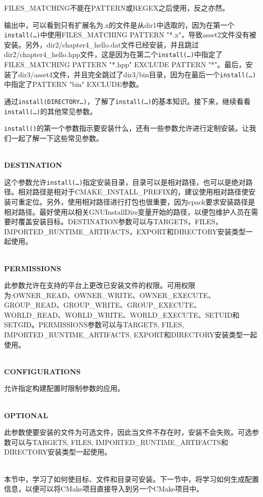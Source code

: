 \begin{tcolorbox}[colback=webgreen!5!white,colframe=webgreen!75!black,title=Note]
FILES\_MATCHING不能在PATTERN或REGEX之后使用，反之亦然。
\end{tcolorbox}

输出中，可以看到只有扩展名为.x的文件是从dir1中选取的，因为在第一个\texttt{install(…)}中使用FILES\_MATCHING PATTERN "*.x"，导致asset2文件没有被安装。另外，dir2/chapter4\_hello.dat文件已经安装，并且跳过dir2/chapter4\_hello.hpp文件，这是因为在第二个\texttt{install(…)}中指定了FILES\_MATCHING PATTERN "*.hpp" EXCLUDE PATTERN "*"。最后，安装了dir3/asset4文件，并且完全跳过了dir3/bin目录，因为在最后一个\texttt{install(…)}中指定了PATTERN "bin" EXCLUDE参数。

通过\texttt{install(DIRECTORY…)}，了解了\texttt{install(…)}的基本知识。接下来，继续看看\texttt{install(…)}的其他常见参数。


\texttt{install()}的第一个参数指示要安装什么，还有一些参数允许进行定制安装。让我们一起了解一下这些常见参数。

\hspace*{\fill} \\ %
\noindent
\textbf{DESTINATION}

这个参数允许\texttt{install(…)}指定安装目录，目录可以是相对路径，也可以是绝对路径。相对路径是相对于CMAKE\_INSTALL\_PREFIX的，建议使用相对路径使安装可重定位。另外，使用相对路径进行打包也很重要，因为cpack要求安装路径是相对路径。最好使用以相关GNUInstallDirs变量开始的路径，以便包维护人员在需要时覆盖安装目标。DESTINATION参数可以与TARGETS，FILES，IMPORTED\_RUNTIME\_ARTIFACTS，EXPORT和DIRECTORY安装类型一起使用。

\hspace*{\fill} \\ %
\noindent
\textbf{PERMISSIONS}

此参数允许在支持的平台上更改已安装文件的权限。可用权限为:OWNER\_READ、OWNER\_WRITE、OWNER\_EXECUTE、GROUP\_READ、GROUP\_WRITE、GROUP\_EXECUTE、WORLD\_READ、WORLD\_WRITE、WORLD\_EXECUTE、SETUID和SETGID。PERMISSIONS参数可以与TARGETS, FILES, IMPORTED\_RUNTIME\_ARTIFACTS, EXPORT和DIRECTORY安装类型一起使用。

\hspace*{\fill} \\ %
\noindent
\textbf{CONFIGURATIONS}

允许指定构建配置时限制参数的应用。

\hspace*{\fill} \\ %
\noindent
\textbf{OPTIONAL}

此参数使要安装的文件为可选文件，因此当文件不存在时，安装不会失败。可选参数可以与TARGETS, FILES, IMPORTED\_RUNTIME\_ARTIFACTS和DIRECTORY安装类型一起使用。

\hspace*{\fill} \\ %
本节中，学习了如何使目标、文件和目录可安装。下一节中，将学习如何生成配置信息，以便可以将CMake项目直接导入到另一个CMake项目中。











